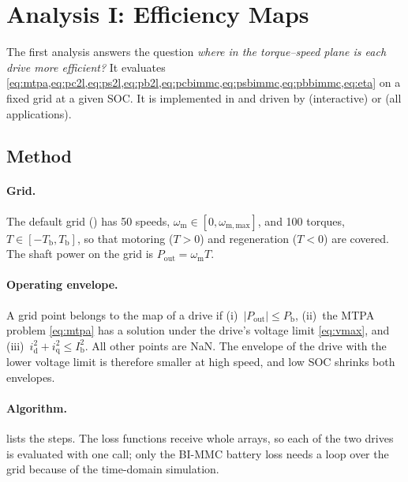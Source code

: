 \section{Analysis I: Efficiency Maps}\label{sec:maps}
The first analysis answers the question \emph{where in the torque--speed plane is each drive more efficient?} It evaluates \cref{eq:mtpa,eq:pc2l,eq:ps2l,eq:pb2l,eq:pcbimmc,eq:psbimmc,eq:pbbimmc,eq:eta} on a fixed grid at a given SOC. It is implemented in  and driven by  (interactive) or  (all applications).

\subsection{Method}
\paragraph{Grid.} The default grid () has 50 speeds, $\omega_\mathrm{m}\in[0,\omega_\mathrm{m,max}]$, and 100 torques, $T\in[-T_\mathrm{b},T_\mathrm{b}]$, so that motoring ($T>0$) and regeneration ($T<0$) are covered. The shaft power on the grid is $P_\mathrm{out}=\omega_\mathrm{m}T$.

\paragraph{Operating envelope.} A grid point belongs to the map of a drive if (i)~$|P_\mathrm{out}|\le P_\mathrm{b}$, (ii)~the MTPA problem \cref{eq:mtpa} has a solution under the drive's voltage limit \cref{eq:vmax}, and (iii)~$i_\mathrm{d}^2+i_\mathrm{q}^2\le I_\mathrm{b}^2$. All other points are NaN. The envelope of the drive with the lower voltage limit is therefore smaller at high speed, and low SOC shrinks both envelopes.

\paragraph{Algorithm.}  lists the steps. The loss functions receive whole arrays, so each of the two drives is evaluated with one call; only the BI-MMC battery loss needs a loop over the grid because of the time-domain simulation.

